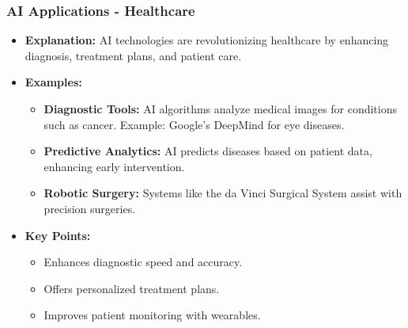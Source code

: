\documentclass[aspectratio=169]{beamer}
\begin{document}
\begin{frame}[fragile]
    \frametitle{AI Applications - Healthcare}
    \begin{itemize}
        \item \textbf{Explanation:} AI technologies are revolutionizing healthcare by enhancing diagnosis, treatment plans, and patient care.
        \item \textbf{Examples:}
        \begin{itemize}
            \item \textbf{Diagnostic Tools:} AI algorithms analyze medical images for conditions such as cancer. Example: Google's DeepMind for eye diseases.
            \item \textbf{Predictive Analytics:} AI predicts diseases based on patient data, enhancing early intervention.
            \item \textbf{Robotic Surgery:} Systems like the da Vinci Surgical System assist with precision surgeries.
        \end{itemize}
        \item \textbf{Key Points:}
        \begin{itemize}
            \item Enhances diagnostic speed and accuracy.
            \item Offers personalized treatment plans.
            \item Improves patient monitoring with wearables.
        \end{itemize}
    \end{itemize}
\end{frame}
\end{document}
